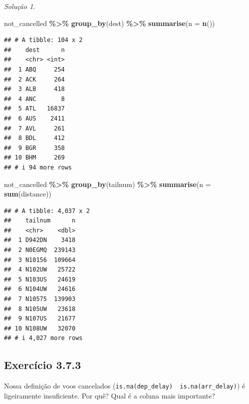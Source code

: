 \documentclass[
]{latex/krantz}
\newenvironment{Shaded}{\begin{snugshade}}{\end{snugshade}}
\newcommand{\AttributeTok}[1]{\textcolor[rgb]{0.13,0.29,0.53}{#1}}
\newcommand{\FunctionTok}[1]{\textcolor[rgb]{0.13,0.29,0.53}{\textbf{#1}}}
\newcommand{\NormalTok}[1]{#1}
\newcommand{\SpecialCharTok}[1]{\textcolor[rgb]{0.81,0.36,0.00}{\textbf{#1}}}
\theoremstyle{definition}
\theoremstyle{definition}
\theoremstyle{definition}
\theoremstyle{definition}
\theoremstyle{remark}
\newtheorem*{solution}{Solução}
\begin{document}
\begin{solution}
\leavevmode

\begin{Shaded}
\begin{Highlighting}[]
\NormalTok{not\_cancelled }\SpecialCharTok{\%\textgreater{}\%}
    \FunctionTok{group\_by}\NormalTok{(dest) }\SpecialCharTok{\%\textgreater{}\%}
    \FunctionTok{summarise}\NormalTok{(}\AttributeTok{n =} \FunctionTok{n}\NormalTok{())}
\end{Highlighting}
\end{Shaded}

\begin{verbatim}
## # A tibble: 104 x 2
##    dest      n
##    <chr> <int>
##  1 ABQ     254
##  2 ACK     264
##  3 ALB     418
##  4 ANC       8
##  5 ATL   16837
##  6 AUS    2411
##  7 AVL     261
##  8 BDL     412
##  9 BGR     358
## 10 BHM     269
## # i 94 more rows
\end{verbatim}

\begin{Shaded}
\begin{Highlighting}[]
\NormalTok{not\_cancelled }\SpecialCharTok{\%\textgreater{}\%}
    \FunctionTok{group\_by}\NormalTok{(tailnum) }\SpecialCharTok{\%\textgreater{}\%}
    \FunctionTok{summarise}\NormalTok{(}\AttributeTok{n =} \FunctionTok{sum}\NormalTok{(distance))}
\end{Highlighting}
\end{Shaded}

\begin{verbatim}
## # A tibble: 4,037 x 2
##    tailnum      n
##    <chr>    <dbl>
##  1 D942DN    3418
##  2 N0EGMQ  239143
##  3 N10156  109664
##  4 N102UW   25722
##  5 N103US   24619
##  6 N104UW   24616
##  7 N10575  139903
##  8 N105UW   23618
##  9 N107US   21677
## 10 N108UW   32070
## # i 4,027 more rows
\end{verbatim}

\end{solution}

\hypertarget{exr3-7-3}{%
\subsection*{Exercício 3.7.3}\label{exr3-7-3}}

Nossa definição de voos cancelados (\texttt{is.na(dep\_delay)\ \textbar{}\ is.na(arr\_delay)}) é ligeiramente insuficiente. Por quê? Qual é a coluna mais importante?
\end{document}
